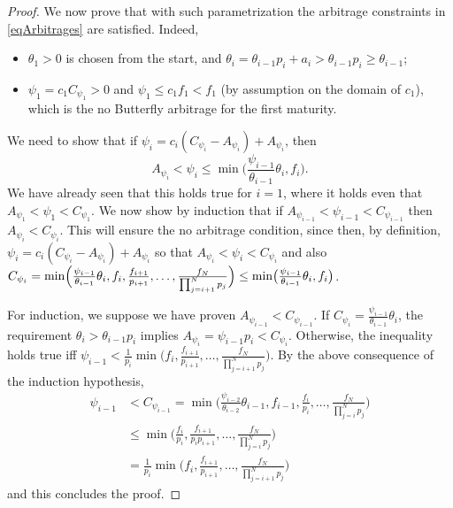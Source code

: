 \documentclass{article}
\begin{document}
	\begin{proof}
We now prove that with such parametrization the arbitrage constraints in \cref{eqArbitrages} are satisfied. Indeed,
\begin{itemize}
\item $\theta_1>0$ is chosen from the start, and $\theta_i=\theta_{i-1}p_i+a_i>\theta_{i-1}p_i\geq\theta_{i-1}$;
\item $\psi_1=c_1C_{\psi_1}>0$ and $\psi_1\leq c_1f_1<f_1$ (by assumption on the domain of $c_1$), which is the no Butterfly arbitrage for the first maturity.
\end{itemize}

We need to show that if $\psi_i=c_i(C_{\psi_i}-A_{\psi_i})+A_{\psi_i}$, then
\begin{equation*}
A_{\psi_i}<\psi_i\leq \min\biggl(\frac{\psi_{i-1}}{\theta_{i-1}}\theta_i,f_i\biggr).
\end{equation*}
We have already seen that this holds true for $i=1$, where it holds even that $A_{\psi_1}<\psi_1< C_{\psi_1}$. We now show by induction that if $A_{\psi_{i-1}}<\psi_{i-1}<C_{\psi_{i-1}}$ then $A_{\psi_i}<C_{\psi_i}$. This will ensure the no arbitrage condition, since then, by definition, $\psi_i=c_i(C_{\psi_i}-A_{\psi_i})+A_{\psi_i}$ so that $A_{\psi_i}<\psi_i< C_{\psi_i}$ and also $C_{\psi_i}=\min\Bigl(\frac{\psi_{i-1}}{\theta_{i-1}}\theta_i,f_i,\frac{f_{i+1}}{p_{i+1}},\dots,\frac{f_N}{\prod_{j={i+1}}^Np_j}\Bigr)\leq\min\bigl(\frac{\psi_{i-1}}{\theta_{i-1}}\theta_i,f_i\bigr)$.

For induction, we suppose we have proven $A_{\psi_{i-1}}<C_{\psi_{i-1}}$. If $C_{\psi_i}=\frac{\psi_{i-1}}{\theta_{i-1}}\theta_i$, the requirement $\theta_i>\theta_{i-1}p_i$ implies $A_{\psi_i}=\psi_{i-1}p_i<C_{\psi_i}$. Otherwise, the inequality holds true iff $\psi_{i-1}<\frac{1}{p_i}\min\bigl(f_i,\frac{f_{i+1}}{p_{i+1}},\dots,\frac{f_N}{\prod_{j={i+1}}^Np_j}\bigr)$. By the above consequence of the induction hypothesis,
\begin{align*}
\psi_{i-1}&<C_{\psi_{i-1}} = \min\biggl(\frac{\psi_{i-2}}{\theta_{i-2}}\theta_{i-1},f_{i-1},\frac{f_{i}}{p_{i}},\dots,\frac{f_N}{\prod_{j={i}}^Np_j}\biggr)\\
&\leq\min\biggl(\frac{f_i}{p_i},\frac{f_{i+1}}{p_ip_{i+1}},\dots,\frac{f_N}{\prod_{j={i}}^Np_j}\biggr) \\
&=\frac{1}{p_i}\min\biggl(f_i,\frac{f_{i+1}}{p_{i+1}},\dots,\frac{f_N}{\prod_{j={i+1}}^Np_j}\biggr)
\end{align*}
and this concludes the proof.
\end{proof}
\end{document}
